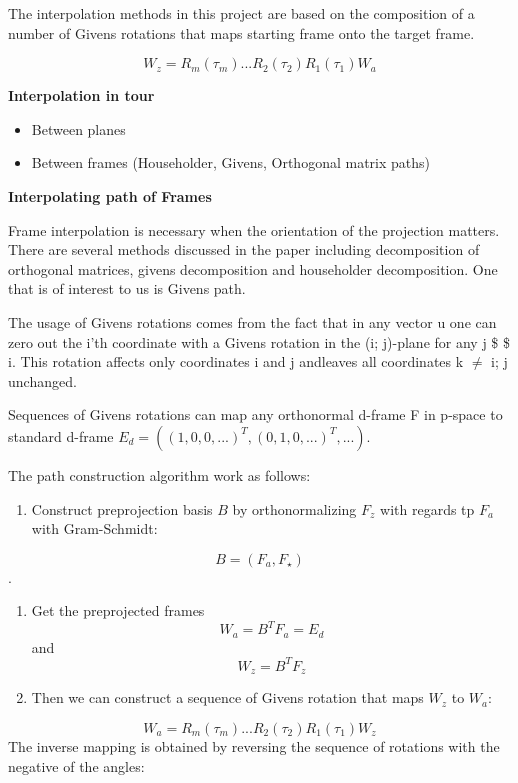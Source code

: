 The interpolation methods in this project are based on the composition of a number of Givens rotations that maps starting frame onto the target frame.

\[ W_z = R_m(\tau_m) ... R_2(\tau_2)R_1(\tau_1)W_a\]

\textbf{Interpolation in tour}

\begin{itemize}
\tightlist
\item
  Between planes
\item
  Between frames (Householder, Givens, Orthogonal matrix paths)
\end{itemize}

\textbf{Interpolating path of Frames}

Frame interpolation is necessary when the orientation of the projection matters. There are several methods discussed in the paper including decomposition of orthogonal matrices, givens decomposition and householder decomposition. One that is of interest to us is Givens path.

The usage of Givens rotations comes from the fact that in any vector u one can zero out the i'th coordinate with a Givens rotation in the (i; j)-plane for any j \$ \neq \$ i. This rotation affects only coordinates i and j andleaves all coordinates k \(\neq\) i; j unchanged.

Sequences of Givens rotations can map any orthonormal d-frame F in p-space to standard d-frame \(E_d=((1, 0, 0, ...)^T, (0, 1, 0, ...)^T, ...)\).

The path construction algorithm work as follows:

\begin{enumerate}
\def\labelenumi{\arabic{enumi}.}
\tightlist
\item
  Construct preprojection basis \(B\) by orthonormalizing \(F_z\) with regards tp \(F_a\) with Gram-Schmidt:
\end{enumerate}

\[B = (F_a, F_{\star})\].

\begin{enumerate}
\def\labelenumi{\arabic{enumi}.}
\setcounter{enumi}{1}
\tightlist
\item
  Get the preprojected frames
  \[W_a = B^TF_a = E_d\] and \[W_z = B^TF_z\]
\item
  Then we can construct a sequence of Givens rotation that maps \(W_z\) to \(W_a\):
\end{enumerate}

\[ W_a = R_m(\tau_m) ... R_2(\tau_2)R_1(\tau_1)W_z\] The inverse mapping is obtained by reversing the sequence of rotations with the negative of the angles:

